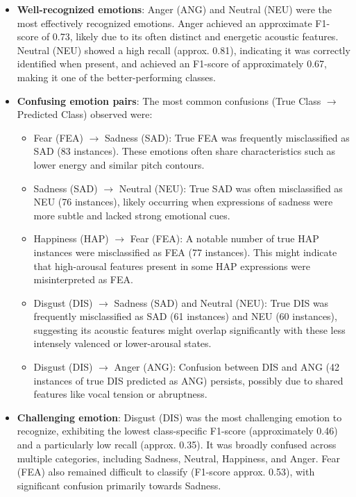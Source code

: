 \begin{itemize}
    \item \textbf{Well-recognized emotions}: Anger (ANG) and Neutral (NEU) were the most effectively recognized emotions. Anger achieved an approximate F1-score of 0.73, likely due to its often distinct and energetic acoustic features. Neutral (NEU) showed a high recall (approx. 0.81), indicating it was correctly identified when present, and achieved an F1-score of approximately 0.67, making it one of the better-performing classes.

    \item \textbf{Confusing emotion pairs}: The most common confusions (True Class $\rightarrow$ Predicted Class) observed were:
    \begin{itemize}
        \item Fear (FEA) $\rightarrow$ Sadness (SAD): True FEA was frequently misclassified as SAD (83 instances). These emotions often share characteristics such as lower energy and similar pitch contours.
        \item Sadness (SAD) $\rightarrow$ Neutral (NEU): True SAD was often misclassified as NEU (76 instances), likely occurring when expressions of sadness were more subtle and lacked strong emotional cues.
        \item Happiness (HAP) $\rightarrow$ Fear (FEA): A notable number of true HAP instances were misclassified as FEA (77 instances). This might indicate that high-arousal features present in some HAP expressions were misinterpreted as FEA.
        \item Disgust (DIS) $\rightarrow$ Sadness (SAD) and Neutral (NEU): True DIS was frequently misclassified as SAD (61 instances) and NEU (60 instances), suggesting its acoustic features might overlap significantly with these less intensely valenced or lower-arousal states.
        \item Disgust (DIS) $\rightarrow$ Anger (ANG): Confusion between DIS and ANG (42 instances of true DIS predicted as ANG) persists, possibly due to shared features like vocal tension or abruptness.
    \end{itemize}

    \item \textbf{Challenging emotion}: Disgust (DIS) was the most challenging emotion to recognize, exhibiting the lowest class-specific F1-score (approximately 0.46) and a particularly low recall (approx. 0.35). It was broadly confused across multiple categories, including Sadness, Neutral, Happiness, and Anger. Fear (FEA) also remained difficult to classify (F1-score approx. 0.53), with significant confusion primarily towards Sadness.
\end{itemize}

